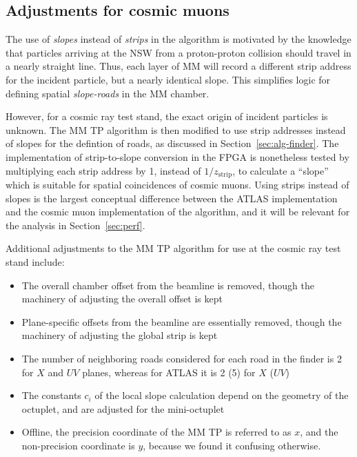 \subsection{Adjustments for cosmic muons}
\label{sec:alg-crts}

The use of \textit{slopes} instead of \textit{strips} in the algorithm is motivated by the knowledge that particles arriving at the NSW from a proton-proton collision should travel in a nearly straight line. Thus, each layer of MM will record a different strip address for the incident particle, but a nearly identical slope. This simplifies logic for defining spatial \textit{slope-roads} in the MM chamber.

However, for a cosmic ray test stand, the exact origin of incident particles is unknown. The MM TP algorithm is then modified to use strip addresses instead of slopes for the defintion of roads, as discussed in Section~\ref{sec:alg-finder}. The implementation of strip-to-slope conversion in the FPGA is nonetheless tested by multiplying each strip address by 1, instead of $1/z_\text{strip}$, to calculate a ``slope'' which is suitable for spatial coincidences of cosmic muons. Using strips instead of slopes is the largest conceptual difference between the ATLAS implementation and the cosmic muon implementation of the algorithm, and it will be relevant for the analysis in Section~\ref{sec:perf}.

Additional adjustments to the MM TP algorithm for use at the cosmic ray test stand include:

\begin{itemize}
  \item The overall chamber offset from the beamline is removed, though the machinery of adjusting the overall offset is kept
  \item Plane-specific offsets from the beamline are essentially removed, though the machinery of adjusting the global strip is kept
  \item The number of neighboring roads considered for each road in the finder is 2 for $X$ and $UV$ planes, whereas for ATLAS it is 2 (5) for $X$ ($UV$)
  \item The constants $c_i$ of the local slope calculation depend on the geometry of the octuplet, and are adjusted for the mini-octuplet
  \item Offline, the precision coordinate of the MM TP is referred to as $x$, and the non-precision coordinate is $y$, because we found it confusing otherwise.
\end{itemize}

